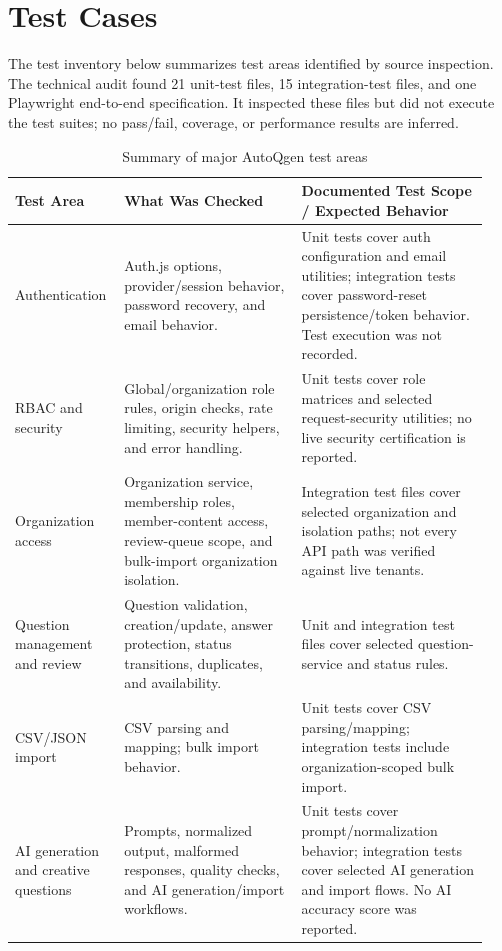 \section{Test Cases}

The test inventory below summarizes test areas identified by source inspection. The technical audit found 21 unit-test files, 15 integration-test files, and one Playwright end-to-end specification. It inspected these files but did not execute the test suites; no pass/fail, coverage, or performance results are inferred.

\begin{table}[H]
    \centering
    \caption{Summary of major AutoQgen test areas}
    \label{tab:test-case-summary}
    \begin{tabular}{|p{0.20\linewidth}|p{0.36\linewidth}|p{0.38\linewidth}|}
        \hline
        \textbf{Test Area} & \textbf{What Was Checked} & \textbf{Documented Test Scope / Expected Behavior} \\
        \hline
        Authentication & Auth.js options, provider/session behavior, password recovery, and email behavior. & Unit tests cover auth configuration and email utilities; integration tests cover password-reset persistence/token behavior. Test execution was not recorded. \\
        \hline
        RBAC and security & Global/organization role rules, origin checks, rate limiting, security helpers, and error handling. & Unit tests cover role matrices and selected request-security utilities; no live security certification is reported. \\
        \hline
        Organization access & Organization service, membership roles, member-content access, review-queue scope, and bulk-import organization isolation. & Integration test files cover selected organization and isolation paths; not every API path was verified against live tenants. \\
        \hline
        Question management and review & Question validation, creation/update, answer protection, status transitions, duplicates, and availability. & Unit and integration test files cover selected question-service and status rules. \\
        \hline
        CSV/JSON import & CSV parsing and mapping; bulk import behavior. & Unit tests cover CSV parsing/mapping; integration tests include organization-scoped bulk import. \\
        \hline
        AI generation and creative questions & Prompts, normalized output, malformed responses, quality checks, and AI generation/import workflows. & Unit tests cover prompt/normalization behavior; integration tests cover selected AI generation and import flows. No AI accuracy score was reported. \\

\end{tabular}
\end{table}
